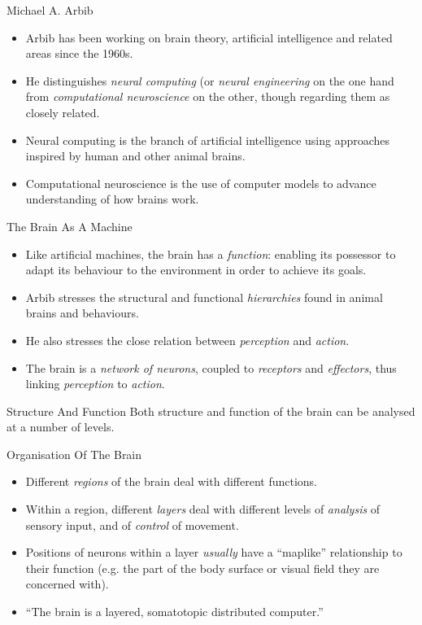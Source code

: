 \documentclass{article}
\begin{document}
\begin{slide}{}
{\Large Michael A. Arbib}
\begin{itemize}
\item Arbib has been working on brain theory, artificial intelligence
and related areas since the 1960s.
\item He distinguishes {\em neural computing} (or {\em neural
engineering} on the one hand from {\em computational neuroscience} on
the other, though regarding them as closely related.
\item Neural computing is the branch of artificial intelligence using
approaches inspired by human and other animal brains.
\item Computational neuroscience is the use of computer models to
advance understanding of how brains work.
\end{itemize}
\end{slide}

\begin{slide}{}
{\Large The Brain As A Machine}
\begin{itemize}
\item Like artificial machines, the brain has a {\em function}:
enabling its possessor to adapt its behaviour to the environment in
order to achieve its goals.
\item Arbib stresses the structural and functional {\em hierarchies}
found in animal brains and behaviours.
\item He also stresses the close relation between {\em perception} and
{\em action}.
\item The brain is a {\em network of neurons}, coupled to {\em receptors}
and {\em effectors}, thus linking {\em perception} to {\em action}. 
\end{itemize}
\end{slide}

\begin{slide}{}
{\Large Structure And Function}
Both structure and function of the brain can be analysed at a number
of levels.
\begin{center}


\end{center}

\end{slide}

\begin{slide}{}
{\Large Organisation Of The Brain}
\begin{itemize}
\item Different {\em regions} of the brain deal with different
functions. 
\item Within a region, different {\em layers} deal with different
levels of {\em analysis} of
sensory input, and of {\em control} of movement.
\item Positions of neurons within a layer {\em usually} have a
``maplike'' relationship to their function (e.g. the part of the body
surface or visual field they are concerned with).
\item ``The brain is a layered, somatotopic distributed computer.''
\end{itemize}
\end{slide}
\end{document}
